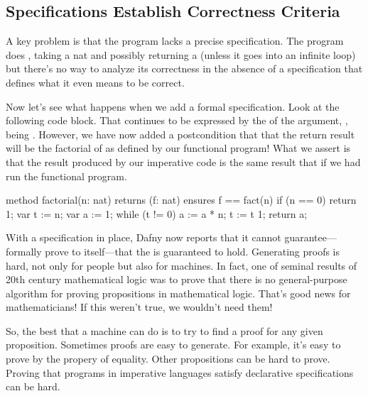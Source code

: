 \documentclass[letterpaper,10pt,english]{sphinxmanual}
\begin{document}
\subsection{Specifications Establish Correctness Criteria}
\label{\detokenize{05-verifying-logical-specifications:specifications-establish-correctness-criteria}}
A key problem is that the program lacks a precise specification. The
program does , taking a nat and possibly returning a 
(unless it goes into an infinite loop) but there’s no way to analyze
its correctness in the absence of a specification that defines what it
even means to be correct.

Now let’s see what happens when we add a formal specification.  Look
at the following code block. That  continues to be expressed
by the  of the argument, , being . However, we have now
added a postcondition that  that the return result will be
the factorial of  as defined by our functional program!  What we
assert is that the result produced by our imperative code is the same
result that  if we had run the functional
program.

\begin{sphinxVerbatim}[commandchars=\\\{\}]
method factorial(n: nat) returns (f: nat)
    ensures f == fact(n)
\PYGZob{}
    if (n == 0)
    \PYGZob{}
        return 1;
    \PYGZcb{}
    var t := n;
    var a := 1;
    while (t !=  0)
    \PYGZob{}
        a := a * n;
        t := t \PYGZhy{} 1;
    \PYGZcb{}
    return a;
\PYGZcb{}
\end{sphinxVerbatim}

With a specification in place, Dafny now reports that it cannot
guarantee—formally prove to itself—that the  is
guaranteed to hold. Generating proofs is hard, not only for people but
also for machines. In fact, one of seminal results of 20th century
mathematical logic was to prove that there is no general-purpose
algorithm for proving propositions in mathematical logic. That’s good
news for mathematicians!  If this weren’t true, we wouldn’t need them!

So, the best that a machine can do is to try to find a proof for any
given proposition. Sometimes proofs are easy to generate. For example,
it’s easy to prove  by the  propery of equality.
Other propositions can be hard to prove. Proving that programs in
imperative languages satisfy declarative specifications can be hard.
\end{document}

